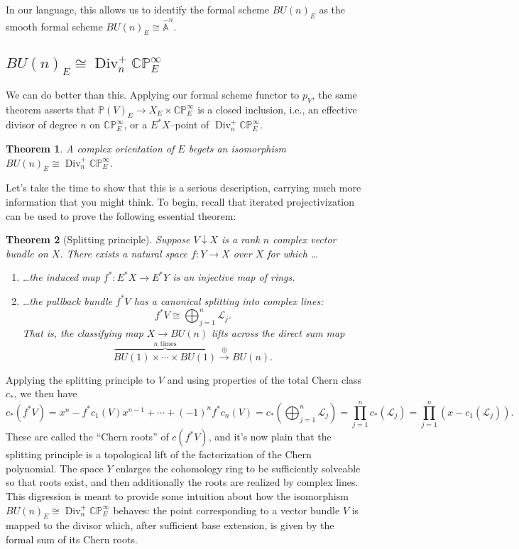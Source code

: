 \documentclass{amsart}
\newcommand{\C}{\mathbb{C}}
\newcommand{\CP}{\C\P}
\newcommand{\A}{\widehat{\mathbb{A}}}
\renewcommand{\L}{\mathcal{L}}
\renewcommand{\P}{\mathbb{P}}
\newcommand{\<}{\langle}
\renewcommand{\>}{\rangle}
\DeclareMathOperator{\Div}{Div}
\theoremstyle{plain}
\newtheorem*{theorem}{Theorem}
\theoremstyle{definition}
\theoremstyle{remark}
\begin{document}
\noindent In our language, this allows us to identify the formal scheme $BU(n)_E$ as the smooth formal scheme $BU(n)_E \cong \A^n$.


\subsection{$BU(n)_E \cong \Div_n^+ \CP^\infty_E$}

We can do better than this.  Applying our formal scheme functor to $p_V$, the same theorem asserts that $\P(V)_E \to X_E \times \CP^\infty_E$ is a closed inclusion, i.e., an effective divisor of degree $n$ on $\CP^\infty_E$, or a $E^* X$--point of $\Div_n^+ \CP^\infty_E$.

\begin{theorem}
A complex orientation of $E$ begets an isomorphism $BU(n)_E \cong \Div_n^+ \CP^\infty_E$.
\end{theorem}

\noindent Let's take the time to show that this is a serious description, carrying much more information that you might think. To begin, recall that iterated projectivization can be used to prove the following essential theorem:

\begin{theorem}[Splitting principle]
Suppose $V \downarrow X$ is a rank $n$ complex vector bundle on $X$.  There exists a natural space $f: Y \to X$ over $X$ for which \ldots
\begin{enumerate}
\item \ldots the induced map $f^*: E^* X \to E^* Y$ is an injective map of rings.
\item \ldots the pullback bundle $f^* V$ has a canonical splitting into complex lines: \[f^* V \cong \bigoplus_{j=1}^n \L_j.\]  That is, the classifying map $X \to BU(n)$ lifts across the direct sum map \[\overset{\text{$n$ times}}{\overbrace{BU(1) \times \cdots \times BU(1)}} \xrightarrow{\oplus} BU(n).\]
\end{enumerate}
\end{theorem}

Applying the splitting principle to $V$ and using properties of the total Chern class $c_*$, we then have
\[
c_*(f^* V) = x^n - f^* c_1(V) x^{n-1} + \cdots + (-1)^n f^* c_n(V) = c_*\left( \bigoplus_{j=1}^n \L_j \right) = \prod_{j=1}^n c_*(\L_j) = \prod_{j=1}^n (x - c_1(\L_j)).
\]
These are called the ``Chern roots'' of $c(f^* V)$, and it's now plain that the splitting principle is a topological lift of the factorization of the Chern polynomial.  The space $Y$ enlarges the cohomology ring to be sufficiently solveable so that roots exist, and then additionally the roots are realized by complex lines.  This digression is meant to provide some intuition about how the isomorphism $BU(n)_E \cong \Div_n^+ \CP^\infty_E$ behaves: the point corresponding to a vector bundle $V$ is mapped to the divisor which, after sufficient base extension, is given by the formal sum of its Chern roots.
\end{document}
